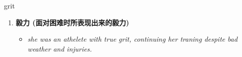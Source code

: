 
\begin{frame}
{\huge grit}
\begin{center}
\begin{enumerate}\Large
  \item \textbf{毅力 (面对困难时所表现出来的毅力)}
  \begin{itemize}
    \item \em{\Large{she was an athelete with true grit, continuing her traning despite bad weather and injuries.}}
  \end{itemize}
\end{enumerate}
\end{center}
\end{frame}
